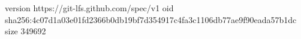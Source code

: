 version https://git-lfs.github.com/spec/v1
oid sha256:4c07d1a03e01fd2366b0db19bf7d354917c4fa3c1106db77ae9f90eada57b1dc
size 349692
